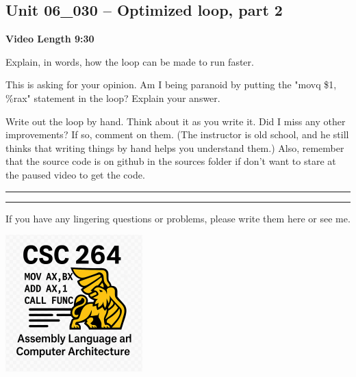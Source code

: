 \documentclass[letterpaper,12pt]{exam}
\newcommand{\unit}{Unit 06}
\begin{document}
\begin{questions}
\section*{\unit\_030 -- Optimized loop, part 2}
\par{\selectfont\textbf{Video Length 9:30}}
\begin{samepage}
    \question Explain, in words, how the loop can be made to run faster.
    \vspace{35mm}
\end{samepage}
\par
\begin{samepage}
    \question This is asking for your opinion.  Am I being paranoid by putting the "movq \$1, \%rax" statement in the loop?  Explain your answer.
    \vspace{25mm}
\end{samepage}
\par
 \begin{samepage}
     \question Write out the loop by hand.  Think about it as you write it.  Did I miss any other improvements?  If so, comment on them. (The instructor is old school, and he still thinks that writing things by hand helps you understand them.)  Also, remember that the source code is on github in the sources folder if don't want to stare at the paused video to get the code.
     \vspace{75mm}
 \end{samepage}
 \par
  
\rule{0.5\textwidth}{.4pt} %





\end{questions} 
\begin{center}
    \rule{0.667\textwidth}{.8pt} %
\end{center}


If you have any lingering questions or problems, please write them here or see me.
\vfill
\begin{center}
\includegraphics{../csc264Logo}
\end{center}
\end{document}
